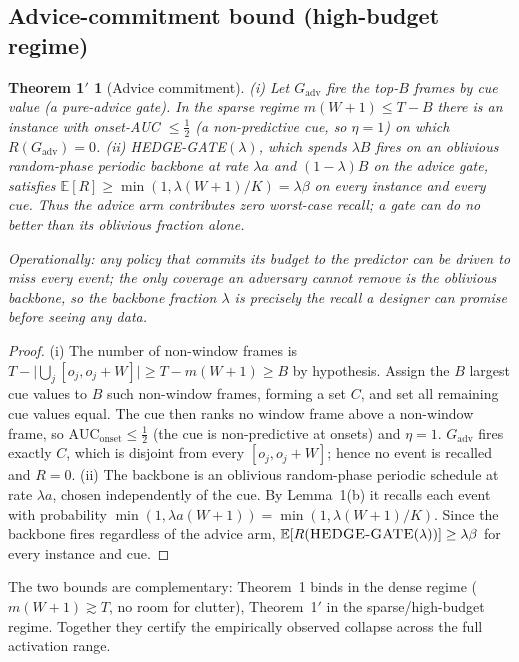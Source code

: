 ﻿\documentclass[lettersize,journal]{IEEEtran}
\newtheorem*{thmonep}{Theorem 1$'$}
\begin{document}
\subsection{Advice-commitment bound (high-budget regime)}
\begin{thmonep}[Advice commitment]
\emph{(i)} Let $G_{\mathrm{adv}}$ fire the top-$B$ frames by cue value (a \emph{pure-advice} gate). In the sparse regime $m(W{+}1)\le T-B$ there is an instance with onset-AUC $\le\tfrac12$ (a non-predictive cue, so $\eta=1$) on which $R(G_{\mathrm{adv}})=0$. \emph{(ii)} \textsc{HEDGE-GATE}$(\lambda)$, which spends $\lambda B$ fires on an oblivious random-phase periodic backbone at rate $\lambda a$ and $(1{-}\lambda)B$ on the advice gate, satisfies $\mathbb E[R]\ge\min(1,\lambda(W{+}1)/K)=\lambda\beta$ on \emph{every} instance and \emph{every} cue. Thus the advice arm contributes zero worst-case recall; a gate can do no better than its oblivious fraction alone.
\end{thmonep}
\noindent\emph{Operationally: any policy that commits its budget to the predictor can be driven to miss every event; the only coverage an adversary cannot remove is the oblivious backbone, so the backbone fraction $\lambda$ is precisely the recall a designer can promise before seeing any data.}
\begin{proof}
(i) The number of non-window frames is $T-\big|\bigcup_j[o_j,o_j{+}W]\big|\ge T-m(W{+}1)\ge B$ by hypothesis. Assign the $B$ largest cue values to $B$ such non-window frames, forming a set $C$, and set all remaining cue values equal. The cue then ranks no window frame above a non-window frame, so $\mathrm{AUC}_{\text{onset}}\le\tfrac12$ (the cue is non-predictive at onsets) and $\eta=1$. $G_{\mathrm{adv}}$ fires exactly $C$, which is disjoint from every $[o_j,o_j{+}W]$; hence no event is recalled and $R=0$. (ii) The backbone is an oblivious random-phase periodic schedule at rate $\lambda a$, chosen independently of the cue. By Lemma~1(b) it recalls each event with probability $\min(1,\lambda a(W{+}1))=\min(1,\lambda(W{+}1)/K)$. Since the backbone fires regardless of the advice arm, $\mathbb E[R(\textsc{HEDGE-GATE}(\lambda))]\ge\lambda\beta$ for every instance and cue.
\end{proof}
\noindent The two bounds are complementary: Theorem~1 binds in the dense regime ($m(W{+}1)\gtrsim T$, no room for clutter), Theorem~1$'$ in the sparse/high-budget regime. Together they certify the empirically observed collapse across the full activation range.
\end{document}
